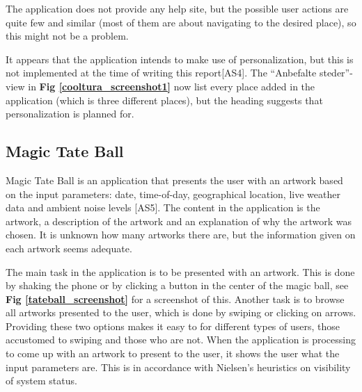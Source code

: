 The application does not provide any help site, but the possible user actions are quite few and similar (most of them are about navigating to the desired place), so this might not be a problem. \newline

It appears that the application intends to make use of personalization, but this is not implemented at the time of writing this report[AS4]. The “Anbefalte steder”-view in \textbf{Fig \ref{cooltura_screenshot1}} now list every place added in the application (which is three different places), but the heading suggests that personalization is planned for. 

\subsection{Magic Tate Ball}

Magic Tate Ball is an application that presents the user with an artwork based on the input parameters: date, time-of-day, geographical location, live weather data and ambient noise levels [AS5]. The content in the application is the artwork, a description of the artwork and an explanation of why the artwork was chosen. It is unknown how many artworks there are, but the information given on each artwork seems adequate. \newline

The main task in the application is to be presented with an artwork. This is done by shaking the phone or by clicking a button in the center of the magic ball, see \textbf{Fig \ref{tateball_screenshot}} for a screenshot of this. Another task is to browse all artworks presented to the user, which is done by swiping or clicking on arrows. Providing these two options makes it easy to for different types of users, those accustomed to swiping and those who are not. When the application is processing to come up with an artwork to present to the user, it shows the user what the input parameters are. This is in accordance with Nielsen’s heuristics on visibility of system status. \newline

